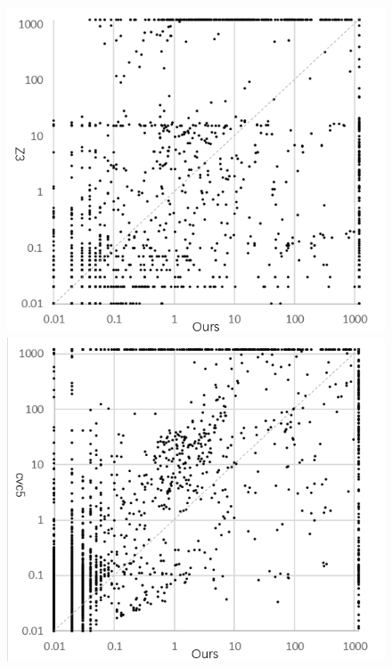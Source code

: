 \begin{figure}[t]
    \centering
    \includegraphics[width=0.45\columnwidth]{Img/scatter_z3b.png}\qquad
    \includegraphics[width=0.45\columnwidth]{Img/scatter_cvc5b.png}
\label{fig:scatter}
\end{figure}